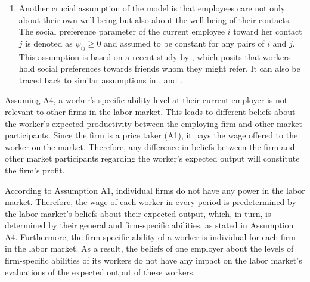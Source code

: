 \documentclass[12pt]{article}
\begin{document}
\begin{enumerate}[label={A}{\arabic*}., resume]
    \item Another crucial assumption of the model is that employees care not only about their own well-being but also about the well-being of their contacts. The social preference parameter of the current employee $i$ toward her contact $j$ is denoted as $\psi_{ij} \geq 0$ and assumed to be constant for any pairs of $i$ and $j$. This assumption is based on a recent study by \cite{friebel2023employee}, which posits that workers hold social preferences towards friends whom they might refer. It can also be traced back to similar assumptions in \cite{bandiera2005social}, \cite{bandiera2009social} and \cite{beaman2012gets}.
\end{enumerate}

Assuming A4, a worker's specific ability level at their current employer is not relevant to other firms in the labor market. This leads to different beliefs about the worker's expected productivity between the employing firm and other market participants. Since the firm is a price taker (A1), it pays the wage offered to the worker on the market. Therefore, any difference in beliefs between the firm and other market participants regarding the worker's expected output will constitute the firm's profit.

According to Assumption A1, individual firms do not have any power in the labor market. Therefore, the wage of each worker in every period is predetermined by the labor market's beliefs about their expected output, which, in turn, is determined by their general and firm-specific abilities, as stated in Assumption A4. Furthermore, the firm-specific ability of a worker is individual for each firm in the labor market. As a result, the beliefs of one employer about the levels of firm-specific abilities of its workers do not have any impact on the labor market's evaluations of the expected output of these workers.
\end{document}
